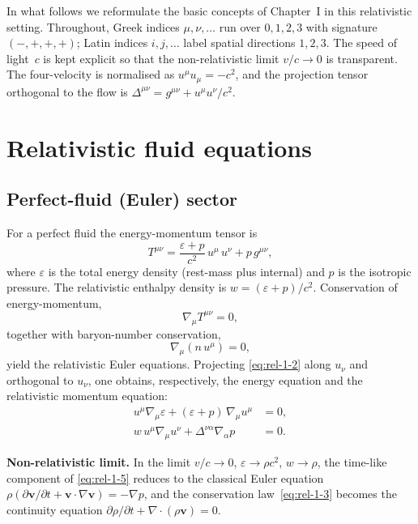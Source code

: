 In what follows we reformulate the basic concepts of Chapter~I in
this relativistic setting.  Throughout, Greek indices
$\mu,\nu,\ldots$ run over $0,1,2,3$ with signature $(-,+,+,+)$;
Latin indices $i,j,\ldots$ label spatial directions $1,2,3$.  The
speed of light~$c$ is kept explicit so that the non-relativistic limit
$v/c\to 0$ is transparent.  The four-velocity is normalised as
$u^{\mu}u_{\mu}=-c^{2}$, and the projection tensor orthogonal to the
flow is $\Delta^{\mu\nu}=g^{\mu\nu}+u^{\mu}u^{\nu}/c^{2}$.

\section{Relativistic fluid equations}
\label{sec:rel-1-2}

\subsection{Perfect-fluid (Euler) sector}
\label{sec:rel-1-2a}

For a perfect fluid the energy-momentum tensor is
\begin{equation}
\label{eq:rel-1-1}
T^{\mu\nu} = \frac{\varepsilon + p}{c^{2}}\,u^{\mu}\,u^{\nu}
              + p\,g^{\mu\nu},
\end{equation}
where $\varepsilon$ is the total energy density (rest-mass plus
internal) and $p$ is the isotropic pressure.  The relativistic
enthalpy density is $w=(\varepsilon+p)/c^{2}$.  Conservation of
energy-momentum,
\begin{equation}
\label{eq:rel-1-2}
\nabla_{\mu}T^{\mu\nu}=0,
\end{equation}
together with baryon-number conservation,
\begin{equation}
\label{eq:rel-1-3}
\nabla_{\mu}(n\,u^{\mu})=0,
\end{equation}
yield the relativistic Euler equations.  Projecting
\eqref{eq:rel-1-2} along $u_{\nu}$ and orthogonal to $u_{\nu}$, one
obtains, respectively, the energy equation and the relativistic
momentum equation:
\begin{align}
u^{\mu}\nabla_{\mu}\varepsilon
  + (\varepsilon+p)\,\nabla_{\mu}u^{\mu} &= 0,
\label{eq:rel-1-4}\\[6pt]
w\,u^{\mu}\nabla_{\mu}u^{\nu}
  + \Delta^{\nu\alpha}\nabla_{\alpha}p &= 0.
\label{eq:rel-1-5}
\end{align}

\noindent\textbf{Non-relativistic limit.}  In the limit
$v/c\to 0$, $\varepsilon\to\rho c^{2}$, $w\to\rho$, the time-like
component of \eqref{eq:rel-1-5} reduces to the classical Euler
equation $\rho(\partial\boldsymbol{v}/\partial t +
\boldsymbol{v}\cdot\nabla\boldsymbol{v})=-\nabla p$, and the
conservation law~\eqref{eq:rel-1-3} becomes the continuity equation
$\partial\rho/\partial t+\nabla\cdot(\rho\boldsymbol{v})=0$.

